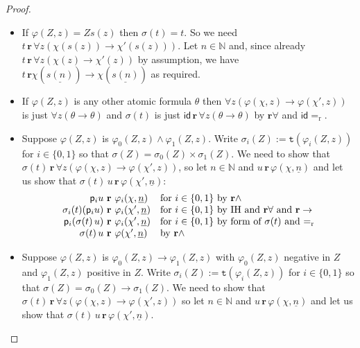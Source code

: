 \documentclass[10pt,a4paper]{amsart}
\theoremstyle{plain}
\theoremstyle{definition}
\renewcommand{\phi}{\varphi}
\newcommand{\dfn}{:=}
\theoremstyle{plain}
\theoremstyle{definition} %
\newcommand{\numeral}[1]{\underline{#1}}
\newcommand{\Nat}{\mathbb{N}}
\newcommand{\id}{\mathsf{id}}
\newcommand{\proj}[1]{\mathsf{p}_{#1}}
\newcommand{\reduction}{\mathrm{r}}
\newcommand{\converts}{=_{\reduction}}
\renewcommand{\land}{\wedge}
\newcommand{\limp}{\to}
\newcommand{\realises}{\mathbf{r}}
\newcommand{\type}[1]{\mathtt t (#1)}
\begin{document}
\begin{proof}
    
    \begin{itemize}
        \item If $\phi(Z,z)=Zs(z)$ then $\sigma(t) = t $. So we need $t\, \realises\, \forall z(\chi(s(z)) \limp \chi'(s(z))) $. Let $n\in \Nat$ and, since already $t\, \realises\, \forall z (\chi(z) \limp \chi'(z))$ by assumption, we have $t\, \realises \chi(\numeral{s(n)}) \limp \chi(\numeral {s(n)})$ as required.
        \item If $\phi(Z,z)$ is any other atomic formula $\theta$ then $\forall z (\phi(\chi,z)\limp \phi(\chi',z))$ is just $\forall z (\theta \limp \theta)$ and $\sigma(t)$ is just $\id\, \realises \, \forall z (\theta \limp \theta)$ by $\realises\forall$ and $\id\converts$.
        \item Suppose $\phi(Z,z)$ is $\phi_0(Z,z) \land \phi_1(Z,z)$. 
        Write $\sigma_i(Z) \dfn \type {\phi_i(Z,z)}$ for $i\in \{0,1\}$ so that $\sigma(Z) = \sigma_0(Z) \times \sigma_1(Z)$.
        We need to show that $\sigma(t)\, \realises\, \forall z (\phi(\chi,z) \limp \phi(\chi',z))$, so let $n\in \Nat$ and $u\, \realises\, \phi(\chi,\numeral n)$ and let us show that $\sigma(t)\, u \, \realises \, \phi(\chi',\numeral n)$:
        \[
        \begin{array}{r@{\ \realises\ }ll}
             \proj i u & \phi_i(\chi,\numeral n) & \text{for $i\in \{0,1\}$ by $\realises\land$} \\
             \sigma_i(t) (\proj i u) & \phi_i(\chi', \numeral n) & \text{for $i\in \{0,1\}$ by IH and $\realises\forall$ and $\realises\limp$} \\
             \proj i (\sigma(t)\, u) & \phi_i(\chi',\numeral n) &\text{for $i\in \{0,1\}$ by form of $\sigma(t)$ and $\converts$} \\
             \sigma(t)\, u  & \phi(\chi',\numeral n) & \text{by $\realises\land$}
        \end{array}
        \]
        \item Suppose $\phi(Z,z)$ is $\phi_0(Z,z) \limp \phi_1(Z,z)$ with $\phi_0(Z,z)$ negative in $Z$ and $\phi_1(Z,z)$ positive in $Z$. 
        Write $\sigma_i(Z)\dfn \type{\phi_i(Z,z)}$ for $i\in \{0,1\}$ so that $\sigma(Z) = \sigma_0(Z) \limp \sigma_1(Z)$.
        We need to show that $\sigma(t)\, \realises\, \forall z (\phi(\chi,z) \limp \phi(\chi',z))$ so let $n\in \Nat $ and $u\, \realises\, \phi(\chi,\numeral n)$ and let us show that $\sigma(t)\, u \, \realises\, \phi(\chi',\numeral n)$.

\end{itemize}
\end{proof}
\end{document}
